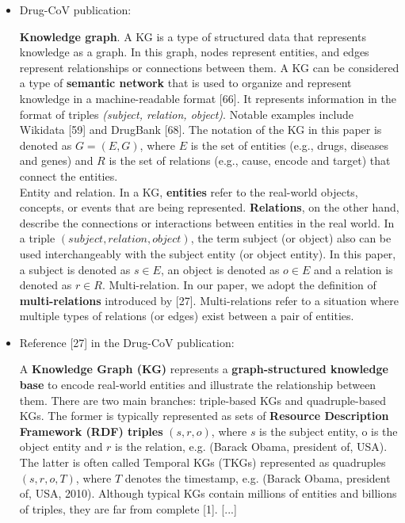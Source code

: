 \documentclass{article}
\begin{document}
\begin{itemize}

\item Drug-CoV publication:
\begin{displayquote}
\textbf{Knowledge graph}. A KG is a type of structured data that represents knowledge as a graph. In this graph, nodes represent entities, and edges represent relationships or connections between them. A KG can be considered a type of \textbf{semantic network} that is used to organize and represent knowledge in a machine-readable format [66]. It represents information in the format of triples \textit{(subject, relation, object)}. Notable examples include Wikidata [59] and DrugBank [68]. The notation of the KG in this paper is denoted as $ G = (E, G) $, where $ E $ is the set of entities (e.g., drugs, diseases and genes) and $ R $ is the set of relations (e.g., cause, encode and target) that connect the entities.\\
Entity and relation. In a KG, \textbf{entities} refer to the real-world objects, concepts, or events that are being represented. \textbf{Relations}, on the other hand, describe the connections or interactions between entities in the real world. In a triple $ (subject, relation, object) $, the term subject (or object) also can be used interchangeably with the subject entity (or object entity). In this paper, a subject is denoted as $ s \in E $, an object is denoted as $ o \in E $ and a relation is denoted as $ r \in R $.
Multi-relation. In our paper, we adopt the definition of \textbf{multi-relations} introduced by [27]. Multi-relations refer to a situation where multiple types of relations (or edges) exist between a pair of entities.
\end{displayquote}


\item Reference [27] in the Drug-CoV publication:
\begin{displayquote}[\cite{li2022}]
A \textbf{Knowledge Graph (KG)} represents a \textbf{graph-structured knowledge base} to encode real-world entities and illustrate the relationship between them. There are two main branches: triple-based KGs and quadruple-based KGs. The former is typically represented as sets of \textbf{Resource Description Framework (RDF) triples} $ (s, r, o) $, where $ s $ is the subject entity, o is the object entity and $ r $ is the relation, e.g. (Barack Obama, president of, USA). The latter is often called Temporal KGs (TKGs) represented as quadruples $ (s, r, o, T) $, where $ T $ denotes the timestamp, e.g. (Barack Obama, president of, USA, 2010). Although typical KGs contain millions of entities and billions of triples, they are far from complete [1]. [...]


\end{displayquote}
\end{itemize}
\end{document}
